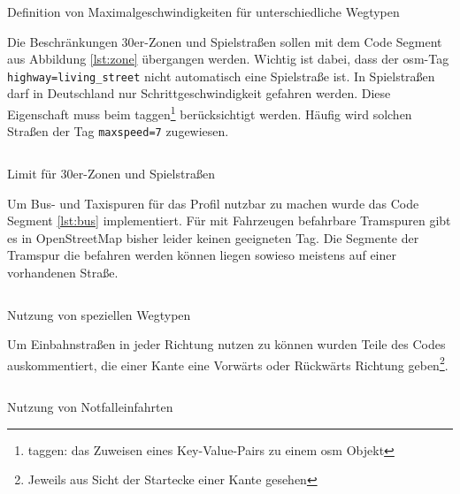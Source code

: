 \begin{listing}[h]
\centering
{}
\inputminted[gobble=8, fontsize=\footnotesize, breaklines=true, firstline=149, lastline=179]{java}{../data/JavaFiles/EmergencyFlagEncoder.java}
\caption{Definition von Maximalgeschwindigkeiten für unterschiedliche Wegtypen}
\label{lst:flag}
\end{listing}

Die Beschränkungen 30er-Zonen und Spielstraßen sollen mit dem Code Segment aus Abbildung \ref{lst:zone} übergangen werden.
Wichtig ist dabei, dass der \gls{osm}-Tag \texttt{highway=living\_street} nicht automatisch eine Spielstraße ist.
In Spielstraßen darf in Deutschland nur Schrittgeschwindigkeit gefahren werden.
Diese Eigenschaft muss beim taggen\footnote{taggen: das Zuweisen eines Key-Value-Pairs zu einem \gls{osm} Objekt} berücksichtigt werden.
Häufig wird solchen Straßen der Tag \texttt{maxspeed=7} zugewiesen.

\begin{listing}[h]
\centering
{}
\inputminted[gobble=2, fontsize=\footnotesize, breaklines=true, firstline=275, lastline=280]{java}{../data/JavaFiles/EmergencyFlagEncoder.java}
\caption{Limit für 30er-Zonen und Spielstraßen}
\label{lst:zone}
\end{listing}

Um Bus- und Taxispuren für das Profil nutzbar zu machen wurde das Code Segment \ref{lst:bus} implementiert.
Für mit Fahrzeugen befahrbare Tramspuren gibt es in OpenStreetMap bisher leider keinen geeigneten Tag.
Die Segmente der Tramspur die befahren werden können liegen sowieso meistens auf einer vorhandenen Straße.

\begin{listing}[h]
\centering
{}
\inputminted[gobble=8, fontsize=\footnotesize, breaklines=true, firstline=366, lastline=373]{java}{../data/JavaFiles/EmergencyFlagEncoder.java}
\caption{Nutzung von speziellen Wegtypen}
\label{lst:bus}
\end{listing}

Um Einbahnstraßen in jeder Richtung nutzen zu können wurden Teile des Codes auskommentiert, die einer Kante eine Vorwärts oder Rückwärts Richtung geben\footnote{Jeweils aus Sicht der Startecke einer Kante gesehen}.

\begin{listing}[h]
\centering
{}
\inputminted[gobble=1, fontsize=\footnotesize, breaklines=true, firstline=503, lastline=504]{java}{../data/JavaFiles/EmergencyFlagEncoder.java}
\caption{Nutzung von Notfalleinfahrten}
\label{lst:weight}
\end{listing}

